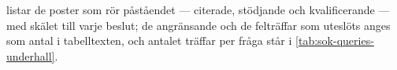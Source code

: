  listar de poster som rör påståendet ---
citerade, stödjande och kvalificerande --- med skälet till varje beslut;
de angränsande och de felträffar som uteslöts anges som antal i
tabelltexten, och antalet träffar per fråga står i
\cref{tab:sok-queries-underhall}.


